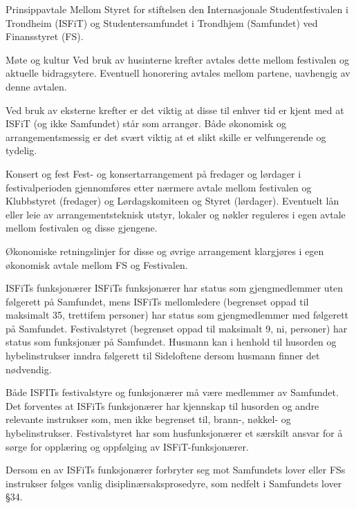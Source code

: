 \begin{instruks}{Prinsippavtale Mellom Styret for stiftelsen den Internasjonale Studentfestivalen i
        Trondheim (ISFiT) og Studentersamfundet i Trondhjem (Samfundet) ved Finansstyret
        (FS).}{}{}
    \begin{instruksledd}{Møte og kultur}
        Ved bruk av husinterne krefter avtales dette mellom festivalen og aktuelle bidragsytere. Eventuell
        honorering avtales
        mellom partene, uavhengig av denne avtalen.

        Ved bruk av eksterne krefter er det viktig at disse til enhver tid er kjent med at ISFiT (og ikke
        Samfundet) står som
        arrangør. Både økonomisk og arrangementsmessig er det svært viktig at et slikt skille er
        velfungerende og tydelig.
    \end{instruksledd}

    \begin{instruksledd}{Konsert og fest}
        Fest- og konsertarrangement på fredager og lørdager i festivalperioden gjennomføres etter nærmere
        avtale mellom
        festivalen og Klubbstyret (fredager) og Lørdagskomiteen og Styret (lørdager). Eventuelt lån eller
        leie av
        arrangementsteknisk utstyr, lokaler og nøkler reguleres i egen avtale mellom festivalen og disse
        gjengene.

        Økonomiske retningslinjer for disse og øvrige arrangement klargjøres i egen økonomisk avtale mellom
        FS og
        Festivalen.
    \end{instruksledd}

    \begin{instruksledd}{ISFiTs funksjonærer} 
        ISFiTs funksjonærer har status som gjengmedlemmer uten følgerett på Samfundet, mens ISFiTs
        mellomledere
        (begrenset oppad til maksimalt 35, trettifem personer) har status som gjengmedlemmer med følgerett
        på Samfundet.
        Festivalstyret (begrenset oppad til maksimalt 9, ni, personer) har status som funksjonær på
        Samfundet. Husmann kan i
        henhold til husorden og hybelinstrukser inndra følgerett til Sideloftene dersom husmann finner det
        nødvendig.

        Både ISFITs festivalstyre og funksjonærer må være medlemmer av Samfundet. Det forventes at ISFiTs
        funksjonærer
        har kjennskap til husorden og andre relevante instrukser som, men ikke begrenset til, brann-,
        nøkkel- og
        hybelinstrukser. Festivalstyret har som husfunksjonærer et særskilt ansvar for å sørge for opplæring
        og oppfølging av
        ISFiT-funksjonærer.

        Dersom en av ISFiTs funksjonærer forbryter seg mot Samfundets lover eller FSs instrukser følges
        vanlig
        disiplinærsaksprosedyre, som nedfelt i Samfundets lover §34.


\end{instruksledd}
\end{instruks}
